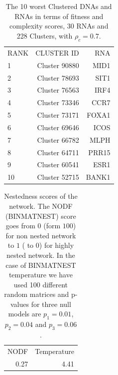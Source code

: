 \documentclass[10pt,a4paper]{article}
\begin{document}
 \begin{table}[h!]
\centering
\caption{\label{tab:tab1} The 10 worst Clustered DNAs and RNAs in terms of fitness and complexity scores, 30 RNAs and 228 Clusters, with $\rho_{c} = 0.7$.}
\begin{tabular}{l|r|r|}
\cline{1-3}
RANK & CLUSTER ID & RNA\\
\cline{1-3}
1 & Cluster 90880 & MID1\\
2 & Cluster 78693 & SIT1\\
3 & Cluster 76563 & IRF4\\
4 & Cluster 73346 & CCR7\\
5 & Cluster 73171 & FOXA1\\
6 & Cluster 69646 & ICOS\\
7 & Cluster 66782 & MLPH\\
8 & Cluster 64711 & PRR15\\
9 & Cluster 60541 & ESR1\\
10 & Cluster 52715 & BANK1\\
\cline{1-3}
\end{tabular}
\end{table}
 \begin{table}[h!]
\centering
\caption{\label{tab:tab2}Nestedness scores of the network. The NODF (BINMATNEST) score goes from $0$ (form $100$) for non nested network to $1$ ( to $0$) for highly nested network. In the case of BINMATNEST temperature we have used 100 different random matrices and p-values for three null models are $p_{1} = 0.01$, $p_{2} = 0.04$ and $p_{3} = 0.06$.}
\begin{tabular}{|r|r|}
\cline{1-2}
NODF & Temperature\\
\cline{1-2}
0.27&4.41\\
\cline{1-2}
\end{tabular}
\end{table}
\clearpage
\printbibliography
	
\end{document}
